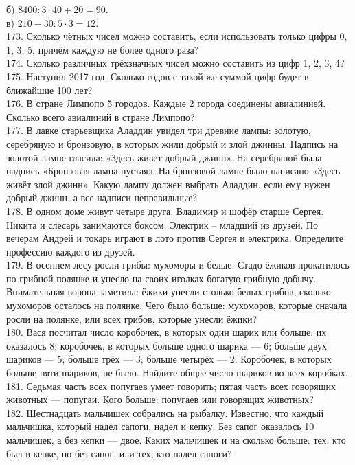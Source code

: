 \documentclass[12pt]{article}
\begin{document}
б) $8400:3\cdot40+20=90.$\\
в) $210-30:5\cdot3=12.$\\
173. Сколько чётных чисел можно составить, если использовать только цифры 0, 1, 3, 5, причём каждую не более одного раза?\\
174. Сколько различных трёхзначных чисел можно составить из цифр 1, 2, 3, 4?\\
175. Наступил 2017 год. Сколько годов с такой же суммой цифр будет в ближайшие 100 лет?\\
176. В стране Лимпопо 5 городов. Каждые 2 города соединены авиалинией. Сколько всего авиалиний в стране Лимпопо?\\
177. В лавке старьевщика Аладдин увидел три древние лампы: золотую, серебряную и бронзовую, в которых жили добрый и злой джинны. Надпись на золотой лампе гласила: «Здесь живет добрый джинн». На серебряной была надпись «Бронзовая лампа пустая». На бронзовой лампе было написано «Здесь живёт злой джинн». Какую лампу должен выбрать Аладдин, если ему нужен добрый джинн, а все надписи неправильные?\\
178. В одном доме живут четыре друга. Владимир и шофёр старше Сергея. Никита и слесарь занимаются боксом. Электрик – младший из друзей. По вечерам Андрей и токарь играют в лото против Сергея и электрика. Определите профессию каждого из друзей.\\
179. В осеннем лесу росли грибы: мухоморы и белые. Стадо ёжиков прокатилось по грибной полянке и унесло на своих иголках богатую грибную добычу. Внимательная ворона заметила: ёжики унесли столько белых грибов, сколько мухоморов осталось на полянке. Чего было больше: мухоморов, которые сначала росли на полянке, или всех грибов, которые унесли ёжики?\\
180. Вася посчитал число коробочек, в которых один шарик или больше: их оказалось 8; коробочек, в которых больше одного шарика --- 6; больше двух шариков --- 5; больше трёх --- 3; больше четырёх --- 2. Коробочек, в которых больше пяти шариков, не было. Найдите общее число шариков во всех коробках.\\
181. Седьмая часть всех попугаев умеет говорить; пятая часть всех говорящих животных --- попугаи. Кого больше: попугаев или говорящих животных?\\
182. Шестнадцать мальчишек собрались на рыбалку. Известно, что каждый мальчишка, который надел сапоги, надел и кепку. Без сапог оказалось 10 мальчишек, а без кепки --- двое. Каких мальчишек и на сколько больше: тех, кто был в кепке, но без сапог, или тех, кто надел сапоги?\\
\end{document}
